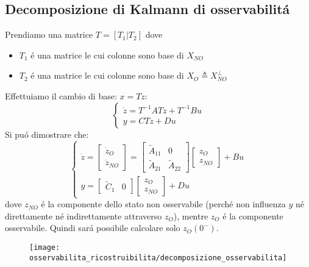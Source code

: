 \documentclass[../main.tex]{subfiles}
\begin{document}
	\subsection{Decomposizione di Kalmann di osservabilit\'a}
		Prendiamo una matrice $ T = [T_1 | T_2] $ dove
		\begin{itemize}
			\item 
				$ T_1 $ \'e una matrice le cui colonne sono base di $ X_{NO} $
			\item
				$ T_2 $ \'e una matrice le cui colonne sono base di $ X_O \triangleq X_{NO}^{\perp} $
		\end{itemize}
		Effettuiamo il cambio di base: $ x = Tz $:
		\[
			\begin{cases}
				\dot z = T^{-1}ATz + T^{-1}Bu\\
				y = CTz + Du
			\end{cases}
		\]
		Si pu\'o dimostrare che:
		\[
			\begin{cases}
				\dot z =
				\begin{bmatrix}
					\dot z_O\\
					\dot z_{NO}
				\end{bmatrix} =
				\begin{bmatrix}
					\tilde A_{11} & 0\\
					\tilde A_{21} & \tilde A_{22}
				\end{bmatrix}
				\begin{bmatrix}
					z_O\\
					z_{NO}
				\end{bmatrix}
				+ Bu
				\\[.5cm]
				y =
				\begin{bmatrix}
					\tilde C_1 & 0
				\end{bmatrix}
				\begin{bmatrix}
					z_{O}\\
					z_{NO}
				\end{bmatrix}
				+ Du
			\end{cases}
		\]
		dove $ z_{NO} $ \'e la componente dello stato non osservabile (perch\'e non influenza $ y $ n\'e direttamente n\'e indirettamente attraverso $ z_O $), mentre $ z_O $ \'e la componente osservabile. Quindi sar\'a possibile calcolare solo $ z_O(0^{-}) $.
		
		\begin{figure}[H]
			\centering\texttt{[image: osservabilita\_ricostruibilita/decomposizione\_osservabilita]}
		\end{figure}
		
\end{document}
